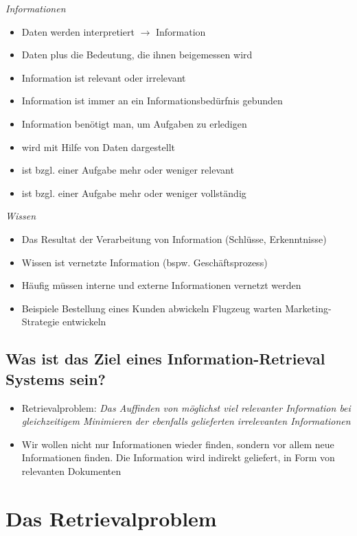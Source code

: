 \documentclass{report}
\theoremstyle{definition}
\theoremstyle{example}
\begin{document}
\textit{Informationen}
\begin{itemize}
   \item Daten werden interpretiert $\rightarrow$ Information
   \item Daten plus die Bedeutung, die ihnen beigemessen wird
   \item Information ist relevant oder irrelevant
   \item Information ist immer an ein Informationsbedürfnis gebunden
   \item Information benötigt man, um Aufgaben zu erledigen
   \item wird mit Hilfe von Daten dargestellt
   \item ist bzgl. einer Aufgabe mehr oder weniger relevant
   \item ist bzgl. einer Aufgabe mehr oder weniger vollständig
\end{itemize}

\textit{Wissen}
\begin{itemize}
   \item Das Resultat der Verarbeitung von Information (Schlüsse, Erkenntnisse)
   \item Wissen ist vernetzte Information (bspw. Geschäftsprozess)
   \item Häufig müssen interne und externe Informationen vernetzt werden
   \item Beispiele
   \subitem Bestellung eines Kunden abwickeln
   \subitem Flugzeug warten
   \subitem Marketing-Strategie entwickeln 
\end{itemize}

\subsection{Was ist das Ziel eines Information-Retrieval Systems sein?}
\begin{itemize}
   \item Retrievalproblem: \textit{Das Auffinden von möglichst viel relevanter Information 
   bei gleichzeitigem Minimieren der ebenfalls gelieferten irrelevanten Informationen}
   \item Wir wollen nicht nur Informationen wieder finden, sondern vor allem neue Informationen finden. 
   Die Information wird indirekt geliefert, in Form von relevanten Dokumenten
\end{itemize}

\section{Das Retrievalproblem}
\end{document}
